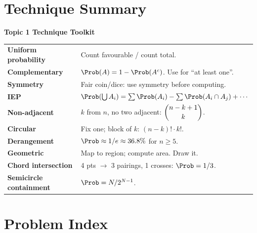 \documentclass[11pt]{article}
\begin{document}
\section{Technique Summary}

\begin{tcolorbox}[breakable, colback=EpiNavy!6, colframe=EpiNavy!50,
                  arc=4pt, left=10pt, right=10pt, top=8pt, bottom=8pt]
\textbf{\color{EpiNavy}Topic 1 Technique Toolkit}\vspace{6pt}

\begin{tabular}{@{}p{4.4cm}p{9.6cm}@{}}
\textbf{Uniform probability}    & Count favourable / count total. \\[3pt]
\textbf{Complementary}          & $\Prob(A)=1-\Prob(A^c)$. Use for ``at least one''. \\[3pt]
\textbf{Symmetry}               & Fair coin/dice: use symmetry before computing. \\[3pt]
\textbf{IEP}                    & $\Prob(\bigcup A_i)=\sum\Prob(A_i)-\sum\Prob(A_i\cap A_j)+\cdots$ \\[3pt]
\textbf{Non-adjacent}           & $k$ from $n$, no two adjacent: $\dbinom{n-k+1}{k}$. \\[3pt]
\textbf{Circular}               & Fix one; block of $k$: $(n-k)!\cdot k!$. \\[3pt]
\textbf{Derangement}            & $\Prob\approx1/e\approx36.8\%$ for $n\geq5$. \\[3pt]
\textbf{Geometric}              & Map to region; compute area. Draw it. \\[3pt]
\textbf{Chord intersection}     & 4 pts $\to$ 3 pairings, 1 crosses: $\Prob=1/3$. \\[3pt]
\textbf{Semicircle containment} & $\Prob=N/2^{N-1}$. \\
\end{tabular}
\end{tcolorbox}

\section{Problem Index}
\end{document}
